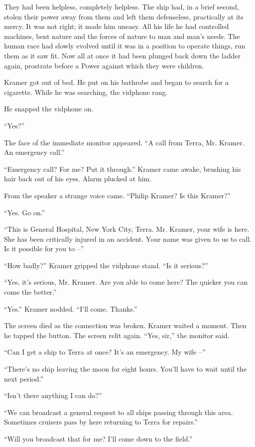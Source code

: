 \documentclass[12pt,a5paper]{book}
\newcommand{\storybreak}{%
  \par\vspace{0.6\baselineskip}
  \begin{center}\color{coveraccent}\small *\enspace *\enspace *\end{center}
  \vspace{0.3\baselineskip}\noindent\ignorespaces
}
\begin{document}
They had been helpless, completely helpless. The ship had, in a brief second, stolen their power away from them and left them defenseless, practically at its mercy. It was not right; it made him uneasy. All his life he had controlled machines, bent nature and the forces of nature to man and man's needs. The human race had slowly evolved until it was in a position to operate things, run them as it saw fit. Now all at once it had been plunged back down the ladder again, prostrate before a Power against which they were children.

Kramer got out of bed. He put on his bathrobe and began to search for a cigarette. While he was searching, the vidphone rang.

He snapped the vidphone on.

“Yes?”

The face of the immediate monitor appeared. “A call from Terra, Mr. Kramer. An emergency call.”

“Emergency call? For me? Put it through.” Kramer came awake, brushing his hair back out of his eyes. Alarm plucked at him.

From the speaker a strange voice came. “Philip Kramer? Is this Kramer?”

“Yes. Go on.”

“This is General Hospital, New York City, Terra. Mr. Kramer, your wife is here. She has been critically injured in an accident. Your name was given to us to call. Is it possible for you to –”

“How badly?” Kramer gripped the vidphone stand. “Is it serious?”

“Yes, it's serious, Mr. Kramer. Are you able to come here? The quicker you can come the better.”

“Yes.” Kramer nodded. “I'll come. Thanks.”

\storybreak
The screen died as the connection was broken. Kramer waited a moment. Then he tapped the button. The screen relit again. “Yes, sir,” the monitor said.

“Can I get a ship to Terra at once? It's an emergency. My wife –”

“There's no ship leaving the moon for eight hours. You'll have to wait until the next period.”

“Isn't there anything I can do?”

“We can broadcast a general request to all ships passing through this area. Sometimes cruisers pass by here returning to Terra for repairs.”

“Will you broadcast that for me? I'll come down to the field.”
\end{document}
